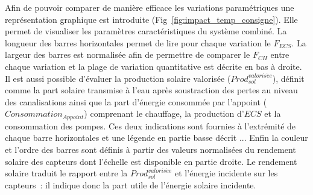 Afin de pouvoir comparer de manière efficace les variations paramétriques une
représentation graphique est introduite (Fig~\ref{fig:impact_temp_consigne}). Elle permet
de visualiser les paramètres caractéristiques du système combiné. La longueur des barres
horizontales permet de lire pour chaque variation le $F_{ECS}$. La largeur des barres est
normalisée afin de permettre de comparer le $F_{CH}$ entre chaque variation et la plage de
variation quantitative est décrite en bas à droite. Il est aussi possible d’évaluer la
production solaire valorisée ($Prod_{sol}^{valoris\acute ee}$), définit comme la part
solaire transmise à l’eau après soustraction des pertes au niveau des canalisations ainsi
que la part d’énergie consommée par l’appoint ($Consommation_{Appoint}$) comprenant le
chauffage, la production d’$ECS$ et la consommation des pompes. Ces deux indications sont
fournies à l’extrémité de chaque barre horizontales et une légende en partie basse décrit
... Enfin la couleur et l’ordre des barres sont définis à partir des valeurs normalisées
du rendement solaire des capteurs dont l’échelle est disponible en partie droite. Le
rendement solaire traduit le rapport entre la $Prod_{sol}^{valoris\acute ee}$ et
l’énergie incidente sur les capteurs~: il indique donc la part utile de l’énergie solaire
incidente.

